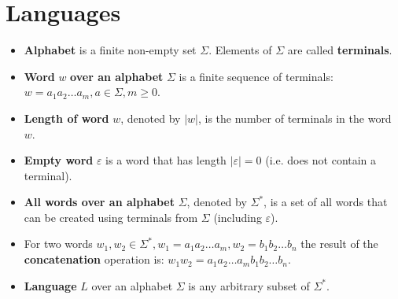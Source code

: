 \documentclass{ctuthesis}
\begin{document}
\section{Languages}
\label{sec:languages-def}
\begin{itemize}
	\item \textbf{Alphabet} is a finite non-empty set $\Sigma$. Elements of $\Sigma$ are called \textbf{terminals}.
	\item \textbf{Word} $w$ \textbf{over an alphabet} $\Sigma$ is a finite sequence of terminals: $w = a_1a_2\ldots a_m, a \in \Sigma, m \geq 0$.
	\item \textbf{Length of word} $w$, denoted by $|w|$, is the number of terminals in the word $w$.
	\item \textbf{Empty word} $\varepsilon$ is a word that has length $|\varepsilon| = 0$ (i.e. does not contain a terminal).
	\item \textbf{All words over an alphabet} $\Sigma$, denoted by $\Sigma^*$, is a set of all words that can be created using terminals from $\Sigma$ (including $\varepsilon$).
	\item For two words $w_1, w_2 \in \Sigma^*, w_1 = a_1a_2\ldots a_m, w_2 = b_1b_2\ldots b_n$ the result of the \textbf{concatenation} operation is: $w_1w_2 = a_1a_2\ldots a_mb_1b_2\ldots b_n$.
	\item \textbf{Language} $L$ over an alphabet $\Sigma$ is any arbitrary subset of $\Sigma^*$.
\end{itemize}
\end{document}
